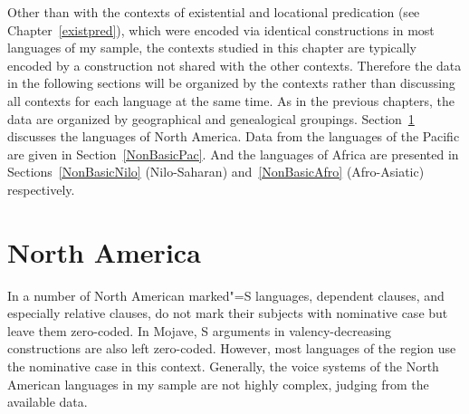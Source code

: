 
Other than with the contexts of existential and locational predication (see Chapter~\ref{existpred}), which were encoded via identical constructions in most languages of my sample, the contexts studied in this chapter are typically encoded by a construction not shared with the other contexts.
Therefore the data in the following sections will be organized by the contexts rather than discussing all contexts for each language at the same time.
As in the previous chapters, the data are organized by geographical and genealogical groupings. 
Section~\ref{NonBasicNA} discusses the languages of North America. Data from the languages of the Pacific are given in Section~\ref{NonBasicPac}. 
And the languages of Africa are presented in Sections~\ref{NonBasicNilo} (Nilo-Saharan) and~\ref{NonBasicAfro} (Afro-Asiatic) respectively.

\section{North America}\label{NonBasicNA}

In a number of North American marked"=S languages, dependent clauses, and especially relative clauses, do not mark their subjects with nominative case but leave them zero-coded. 
In Mojave, S arguments in valency-decreasing constructions are also left zero-coded. 
However, most languages of the region use the nominative  case in this context. 
Generally, the voice systems of the North American languages in my sample are not highly complex, judging from the available data. %

